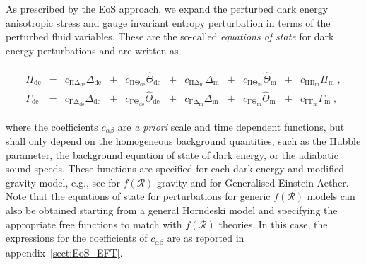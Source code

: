 \documentclass[nofootinbib,a4paper,aps,prd,10pt,superscriptaddress,reprint,showkeys,showpacs]{revtex4-1}
\begin{document}
As prescribed by the EoS approach, we expand the perturbed dark energy anisotropic stress and gauge invariant entropy 
perturbation in terms of the perturbed fluid variables. These are the so-called \textit{equations of state} for dark 
energy perturbations and are written as
\begin{widetext}
 \begin{align}
  \begin{array}{ccccccccccc}
   \Pi_{{\scriptscriptstyle\mathrm{de}}} & = & 
     c_{{\scriptscriptstyle\mathrm{\Pi\Delta_{{\scriptscriptstyle\mathrm{de}}}}}}
     \Delta_{{\scriptscriptstyle \mathrm{de}}} &+& 
     c_{{\scriptscriptstyle \mathrm{\Pi\Theta_{{\scriptscriptstyle \mathrm{de}}}}}}
     {\hat{\Theta}}_{{\scriptscriptstyle \mathrm{de}}} &+& 
     c_{{\scriptscriptstyle \mathrm{\Pi\Delta_{{\scriptscriptstyle \mathrm{m}}}}}}
     \Delta_{{\scriptscriptstyle \mathrm{m}}} &+& 
     c_{{\scriptscriptstyle \mathrm{\Pi\Theta_{{\scriptscriptstyle \mathrm{m}}}}}}
     {\hat{\Theta}}_{{\scriptscriptstyle \mathrm{m}}} &+& 
     c_{{\scriptscriptstyle \mathrm{\Pi\Pi_{{\scriptscriptstyle \mathrm{m}}}}}}
     {\Pi}_{{\scriptscriptstyle \mathrm{m}}}\;,\\
   \Gamma_{{\scriptscriptstyle \mathrm{de}}} & = & 
     c_{{\scriptscriptstyle \mathrm{\Gamma\Delta_{{\scriptscriptstyle \mathrm{de}}}}}}
     \Delta_{{\scriptscriptstyle \mathrm{de}}} &+& 
     c_{{\scriptscriptstyle \mathrm{\Gamma\Theta_{{\scriptscriptstyle \mathrm{de}}}}}}
     {\hat{\Theta}}_{{\scriptscriptstyle \mathrm{de}}} &+& 
     c_{{\scriptscriptstyle \mathrm{\Gamma\Delta_{{\scriptscriptstyle \mathrm{m}}}}}}
     \Delta_{{\scriptscriptstyle \mathrm{m}}} &+& 
     c_{{\scriptscriptstyle \mathrm{\Gamma\Theta_{{\scriptscriptstyle \mathrm{m}}}}}}
     {\hat{\Theta}}_{{\scriptscriptstyle \mathrm{m}}}&+& 
     c_{{\scriptscriptstyle \mathrm{\Gamma\Gamma_{{\scriptscriptstyle \mathrm{m}}}}}}
     {\Gamma}_{{\scriptscriptstyle \mathrm{m}}}\;,
  \end{array}\label{eq:eos}
 \end{align}
\end{widetext}
where the coefficients $c_{\alpha\beta}$ are \textit{a priori} scale and time dependent functions, but shall only 
depend on the homogeneous background quantities, such as the Hubble parameter, the background equation of state of dark 
energy, or the adiabatic sound speeds. These functions are specified for each dark energy and modified gravity model, 
e.g., see \citep{Battye2016a} for $f(\mathcal{R})$ gravity and \citep{Battye2017} for Generalised Einstein-Aether. 
Note that the equations of state for perturbations for generic $f(\mathcal{R})$ models can also be obtained starting 
from a general Horndeski model and specifying the appropriate free functions to match with $f(\mathcal{R})$ theories. 
In this case, the expressions for the coefficients of $c_{\alpha\beta}$ are as reported in appendix~\ref{sect:EoS_EFT}.
\end{document}
